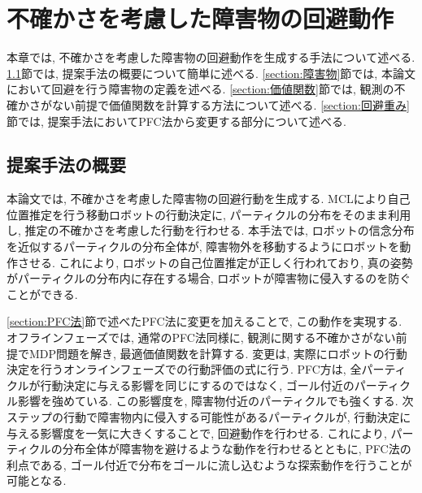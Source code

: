 \chapter{不確かさを考慮した障害物の回避動作} \label{chapter:method}
本章では, 不確かさを考慮した障害物の回避動作を生成する手法について述べる. 
\ref{section:method overview}節では, 提案手法の概要について簡単に述べる. 
\ref{section:障害物}節では, 本論文において回避を行う障害物の定義を述べる. 
\ref{section:価値関数}節では, 観測の不確かさがない前提で価値関数を計算する方法について述べる. 
\ref{section:回避重み}節では, 提案手法においてPFC法から変更する部分について述べる. 


\section{提案手法の概要} \label{section:method overview}
本論文では, 不確かさを考慮した障害物の回避行動を生成する. 
MCLにより自己位置推定を行う移動ロボットの行動決定に, パーティクルの分布をそのまま利用し, 推定の不確かさを考慮した行動を行わせる. 
本手法では, ロボットの信念分布を近似するパーティクルの分布全体が, 障害物外を移動するようにロボットを動作させる. 
これにより, ロボットの自己位置推定が正しく行われており, 真の姿勢がパーティクルの分布内に存在する場合, 
ロボットが障害物に侵入するのを防ぐことができる. 



\ref{section:PFC法}節で述べたPFC法に変更を加えることで, この動作を実現する. 
オフラインフェーズでは, 通常のPFC法同様に, 観測に関する不確かさがない前提でMDP問題を解き, 最適価値関数を計算する. 
変更は, 実際にロボットの行動決定を行うオンラインフェーズでの行動評価の式に行う. 
PFC方は, 全パーティクルが行動決定に与える影響を同じにするのではなく, ゴール付近のパーティクル影響を強めている. 
この影響度を, 障害物付近のパーティクルでも強くする. 
次ステップの行動で障害物内に侵入する可能性があるパーティクルが, 行動決定に与える影響度を一気に大きくすることで, 回避動作を行わせる. 
これにより, パーティクルの分布全体が障害物を避けるような動作を行わせるとともに, PFC法の利点である, ゴール付近で分布をゴールに流し込むような探索動作を行うことが可能となる. 


